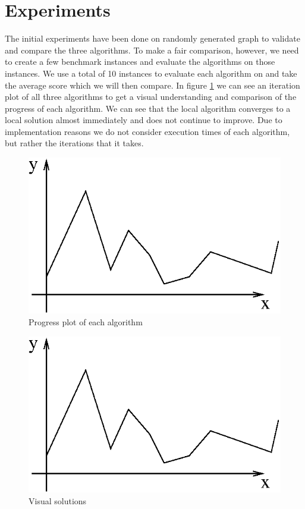 \documentclass[journal]{IEEEtrancz}
\begin{document}
\section{Experiments}
The initial experiments have been done on randomly generated graph to validate and compare the three algorithms.
To make a fair comparison, however, we need to create a few benchmark instances and evaluate the algorithms on those instances. We use a total of 10 instances to evaluate each algorithm on and take the average score which we will then compare. In figure \ref{fig:progfig} we can see an iteration plot of all three algorithms to get 
a visual understanding and comparison of the progress of each algorithm. We can see that the local algorithm
converges to a local solution almost immediately and does not continue to improve. Due to implementation reasons we do not consider execution times of each algorithm, but rather the iterations that it takes. 


\begin{figure}[ht]
  \centering
    \includegraphics{figure}
      \caption{Progress plot of each algorithm}
    \label{fig:progfig}
\end{figure}

\begin{figure}[ht]
  \centering
    \includegraphics{figure}
      \caption{Visual solutions}
    \label{fig:solfig}
\end{figure}
\end{document}
